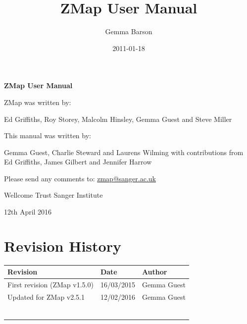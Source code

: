 \documentclass[letterpaper]{article}
\title{ZMap User Manual}
\author{Gemma Barson}
\date{2011-01-18}
\begin{document}
\setcounter{page}{1}\pagestyle{Standard}


\thispagestyle{FirstPage}
{\centering\sffamily\bfseries\color[rgb]{0.0,0.27058825,0.5254902}
\Huge\bf{ZMap User Manual}\par}

\bigskip

\bigskip

{\centering\large{ZMap was written by:}\par
\large{Ed Griffiths, Roy Storey, Malcolm Hinsley, Gemma Guest and Steve Miller}\par
}

\bigskip

\bigskip

{\centering\large{This manual was written by:}\par
\large{Gemma Guest, Charlie Steward and Laurens Wilming with contributions from
Ed Griffiths, James Gilbert and Jennifer Harrow}\par
}


\bigskip

\bigskip

{\centering\large{Please send any comments to: \href{mailto:zmap@sanger.ac.uk}{zmap@sanger.ac.uk}}\par
}


\bigskip

\bigskip

{\centering\large{Wellcome Trust Sanger Institute}\par}
{\centering12th April 2016\par}




\clearpage
{\color[rgb]{0.0,0.27058825,0.5254902}\section[Revision History]{Revision History}}
\hypertarget{RefHeading334316266717}{}

\begin{center}
\tablehead{}
\begin{supertabular}{|m{8cm}|m{3.2849998cm}|m{3.282cm}|}
\hline
\bfseries Revision &
\bfseries Date &
\bfseries Author\\\hline
 First revision (ZMap v1.5.0) &
 16/03/2015 &
 Gemma Guest\\\hline
 Updated for ZMap v2.5.1 &
 12/02/2016 &
 Gemma Guest\\\hline
 &
 &
 \\\hline
 &
 &
 \\\hline
 &
 &
 \\\hline
 &
 &
 \\\hline
 &
 &
 \\\hline
 &
 &
 \\\hline
\end{supertabular}
\end{center}
\end{document}
